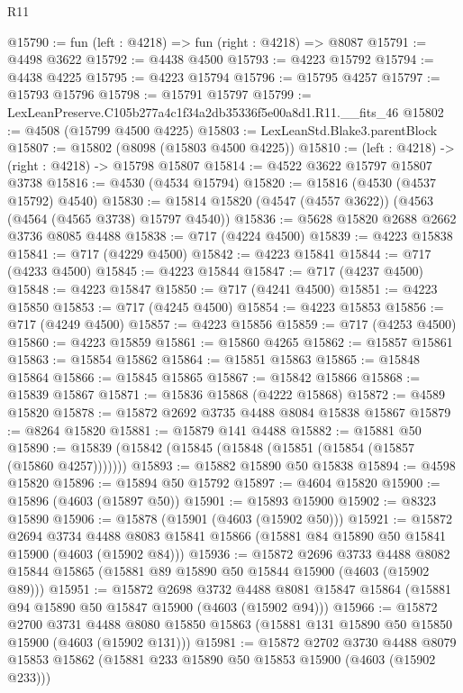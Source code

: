 \begin{lexlean}{R11}
\begin{coremodule}
@15790 := fun (left : @4218) => fun (right : @4218) => @8087
@15791 := @4498 @3622
@15792 := @4438 @4500
@15793 := @4223 @15792
@15794 := @4438 @4225
@15795 := @4223 @15794
@15796 := @15795 @4257
@15797 := @15793 @15796
@15798 := @15791 @15797
@15799 := LexLeanPreserve.C105b277a4c1f34a2db35336f5e00a8d1.R11.__fits_46
@15802 := @4508 (@15799 @4500 @4225)
@15803 := LexLeanStd.Blake3.parentBlock
@15807 := @15802 (@8098 (@15803 @4500 @4225))
@15810 := (left : @4218) -> (right : @4218) -> @15798 @15807
@15814 := @4522 @3622 @15797 @15807 @3738
@15816 := @4530 (@4534 @15794)
@15820 := @15816 (@4530 (@4537 @15792) @4540)
@15830 := @15814 @15820 (@4547 (@4557 @3622)) (@4563 (@4564 (@4565 @3738) @15797 @4540))
@15836 := @5628 @15820 @2688 @2662 @3736 @8085 @4488
@15838 := @717 (@4224 @4500)
@15839 := @4223 @15838
@15841 := @717 (@4229 @4500)
@15842 := @4223 @15841
@15844 := @717 (@4233 @4500)
@15845 := @4223 @15844
@15847 := @717 (@4237 @4500)
@15848 := @4223 @15847
@15850 := @717 (@4241 @4500)
@15851 := @4223 @15850
@15853 := @717 (@4245 @4500)
@15854 := @4223 @15853
@15856 := @717 (@4249 @4500)
@15857 := @4223 @15856
@15859 := @717 (@4253 @4500)
@15860 := @4223 @15859
@15861 := @15860 @4265
@15862 := @15857 @15861
@15863 := @15854 @15862
@15864 := @15851 @15863
@15865 := @15848 @15864
@15866 := @15845 @15865
@15867 := @15842 @15866
@15868 := @15839 @15867
@15871 := @15836 @15868 (@4222 @15868)
@15872 := @4589 @15820
@15878 := @15872 @2692 @3735 @4488 @8084 @15838 @15867
@15879 := @8264 @15820
@15881 := @15879 @141 @4488
@15882 := @15881 @50
@15890 := @15839 (@15842 (@15845 (@15848 (@15851 (@15854 (@15857 (@15860 @4257)))))))
@15893 := @15882 @15890 @50 @15838
@15894 := @4598 @15820
@15896 := @15894 @50 @15792
@15897 := @4604 @15820
@15900 := @15896 (@4603 (@15897 @50))
@15901 := @15893 @15900
@15902 := @8323 @15890
@15906 := @15878 (@15901 (@4603 (@15902 @50)))
@15921 := @15872
    @2694
    @3734
    @4488
    @8083
    @15841
    @15866
    (@15881 @84 @15890 @50 @15841 @15900 (@4603 (@15902 @84)))
@15936 := @15872
    @2696
    @3733
    @4488
    @8082
    @15844
    @15865
    (@15881 @89 @15890 @50 @15844 @15900 (@4603 (@15902 @89)))
@15951 := @15872
    @2698
    @3732
    @4488
    @8081
    @15847
    @15864
    (@15881 @94 @15890 @50 @15847 @15900 (@4603 (@15902 @94)))
@15966 := @15872
    @2700
    @3731
    @4488
    @8080
    @15850
    @15863
    (@15881 @131 @15890 @50 @15850 @15900 (@4603 (@15902 @131)))
@15981 := @15872
    @2702
    @3730
    @4488
    @8079
    @15853
    @15862
    (@15881 @233 @15890 @50 @15853 @15900 (@4603 (@15902 @233)))

\end{coremodule}
\end{lexlean}
